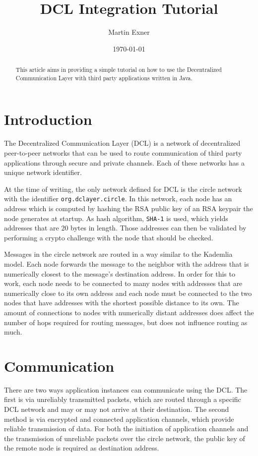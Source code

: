\documentclass[a4paper,twocolumn]{article}
\title{DCL Integration Tutorial}
\author{Martin Exner}
\date{\today}
\newcommand{\code}[1]{\texttt{#1}}
\begin{document}
\maketitle

\begin{abstract}
This article aims in providing a simple tutorial on how to use the
Decentralized Communication Layer with third party applications written
in Java.
\end{abstract}

\section*{Introduction}
The Decentralized Communication Layer (DCL) is a network of decentralized
peer-to-peer networks that can be used to route communication of third party
applications through secure and private channels. Each of these networks has a
unique network identifier.

At the time of writing, the only network defined for DCL is the circle network
with the identifier \code{org.dclayer.circle}. In this network, each node has
an address which is computed by hashing the RSA public key of an RSA keypair
the node generates at startup. As hash algorithm, \code{SHA-1} is used, which
yields addresses that are 20 bytes in length. Those addresses can then be
validated by performing a crypto challenge with the node that should be checked.

Messages in the circle network are routed in a way similar to the Kademlia
model. Each node forwards the message to the neighbor with the address that is
numerically closest to the message's destination address. In order for this to
work, each node needs to be connected to many nodes with addresses that are
numerically close to its own address and each node must be connected to the two
nodes that have addresses with the shortest possible distance to its own. The
amount of connections to nodes with numerically distant addresses does affect
the number of hops required for routing messages, but does not influence routing
as much.

\section*{Communication}
There are two ways application instances can communicate using the DCL.
The first is via unreliably transmitted packets, which are routed through a
specific DCL network and may or may not arrive at their destination.
The second method is via encrypted and connected application channels, which
provide reliable transmission of data. For both the initiation of application
channels and the transmission of unreliable packets over the circle network, the
public key of the remote node is required as destination address.
\end{document}

